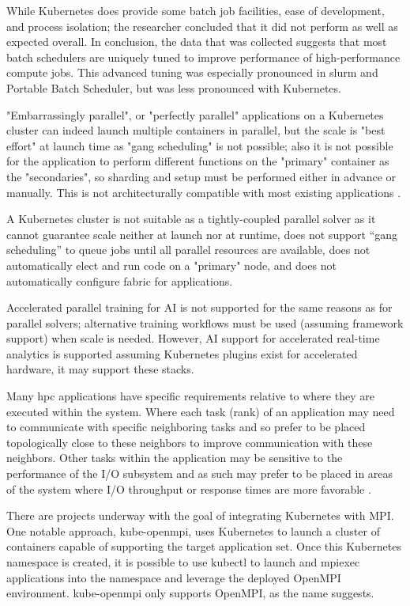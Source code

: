 \documentclass[conference]{IEEEtran}
\begin{document}
While Kubernetes does provide some batch job facilities, ease of development, and process isolation; the researcher concluded that it did not perform as well as expected overall. In conclusion, the data that was collected suggests that most batch schedulers are uniquely tuned to improve performance of high-performance compute jobs. This advanced tuning was especially pronounced in \gls{slurm} and Portable Batch Scheduler, but was less pronounced with Kubernetes.

"Embarrassingly parallel", or "perfectly parallel" applications on a Kubernetes cluster can indeed launch multiple containers in parallel, but the scale is "best effort" at launch time as "gang scheduling" is not possible; also it is not possible for the application to perform different functions on the "primary" container as the "secondaries", so sharding and setup must be performed either in advance or manually. This is not architecturally compatible with most existing applications \cite{hpc-on-kubernetes}.

A Kubernetes cluster is not suitable as a tightly-coupled parallel solver as it cannot guarantee scale neither at launch nor at runtime, does not support “gang scheduling” to queue jobs until all parallel resources are available, does not automatically elect and run code on a "primary" node, and does not automatically configure fabric for applications.

Accelerated parallel training for AI is not supported for the same reasons as for parallel solvers; alternative training
workflows must be used (assuming framework support) when scale is needed. However, AI support for accelerated real-time analytics is supported assuming Kubernetes plugins exist for accelerated hardware, it may support these stacks.

Many \gls{hpc} applications have specific requirements relative to where they are executed within the system. Where each task (rank) of an application may need to communicate with specific neighboring tasks and so prefer to be placed topologically close to these neighbors to improve communication with these neighbors. Other tasks within the application may be sensitive to the performance of the I/O subsystem and as such may prefer to be placed in areas of the system where I/O throughput or response times are more favorable \cite{stackhpc-kubernetes-mpi}.

There are projects underway with the goal of integrating Kubernetes with MPI. One notable approach, kube-openmpi, uses Kubernetes to launch a cluster of containers capable of supporting the target application set. Once this Kubernetes namespace is created, it is possible to use kubectl to launch and mpiexec applications into the namespace and leverage the deployed OpenMPI environment. kube-openmpi only supports OpenMPI, as the name suggests.
\end{document}
